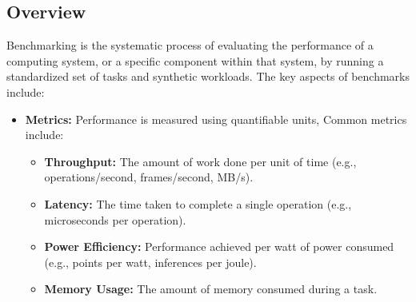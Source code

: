 \subsection{Overview}
Benchmarking is the systematic process of evaluating the performance of a computing system, or a specific component within that system, by running a standardized set of tasks and synthetic workloads.
The key aspects of benchmarks include:
\begin{itemize}
    \item \textbf{Metrics:} Performance is measured using quantifiable units, Common metrics include:
        \begin{itemize}
            \item \textbf{Throughput:} The amount of work done per unit of time (e.g., operations/second, frames/second, MB/s).
            \item \textbf{Latency:} The time taken to complete a single operation (e.g., microseconds per operation).
            \item \textbf{Power Efficiency:} Performance achieved per watt of power consumed (e.g., points per watt, inferences per joule).
            \item \textbf{Memory Usage:} The amount of memory consumed during a task.
            \end{itemize}
\end{itemize}
